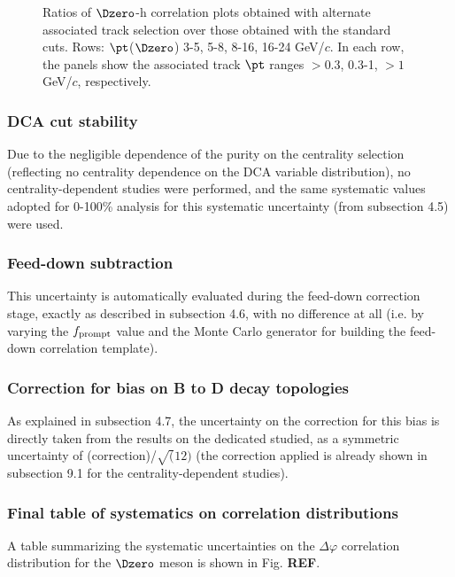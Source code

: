\begin{figure}
 \caption{Ratios of $\Dzero$-h correlation plots obtained with alternate associated track selection over those obtained with the standard cuts. Rows: $\pt$($\Dzero$) 3-5, 5-8, 8-16, 16-24 GeV/$c$. In each row, the panels show the associated track
$\pt$ ranges $> 0.3$, 0.3-1, $> 1$ GeV/$c$, respectively.}
\label{fig:SysTrEff60100}
\end{figure}

\subsubsection{DCA cut stability}
Due to the negligible dependence of the purity on the centrality selection (reflecting no centrality dependence on the DCA variable  distribution), no centrality-dependent studies were performed, and the same systematic values adopted for 0-100\% analysis for this systematic uncertainty (from subsection 4.5) were used.

\subsubsection{Feed-down subtraction}
This uncertainty is automatically evaluated during the feed-down correction stage, exactly as described in subsection 4.6, with no difference at all (i.e. by varying the $f_{\rm prompt}$ value and the Monte Carlo generator for building the feed-down correlation template).

\subsubsection{Correction for bias on B to D decay topologies}
As explained in subsection 4.7, the uncertainty on the correction for this bias is directly taken from the results on the dedicated studied, as a symmetric uncertainty of (correction)/$\sqrt(12)$ (the correction applied is already shown in subsection 9.1 for the centrality-dependent studies).

\subsubsection{Final table of systematics on correlation distributions}
A table summarizing the systematic uncertainties on the $\Delta\varphi$ correlation distribution for the $\Dzero$ meson is shown in Fig. {\bf REF}.

